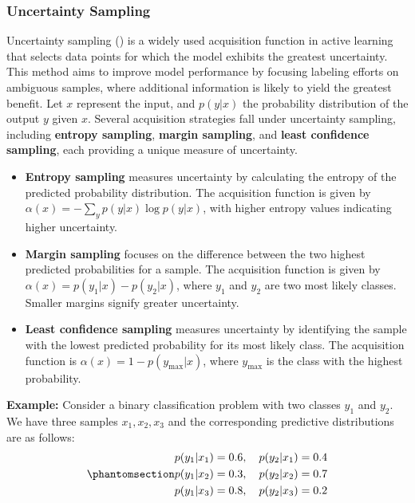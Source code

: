 \documentclass[
  letterpaper,
  numbers=noenddot,
  DIV=11]{scrreprt}
\theoremstyle{definition}
\theoremstyle{plain}
\theoremstyle{plain}
\theoremstyle{remark}
\begin{document}
\subsubsection*{Uncertainty Sampling}\label{uncertainty-sampling}

Uncertainty sampling () is
a widely used acquisition function in active learning that selects data
points for which the model exhibits the greatest uncertainty. This
method aims to improve model performance by focusing labeling efforts on
ambiguous samples, where additional information is likely to yield the
greatest benefit. Let \(x\) represent the input, and \(p(y|x)\) the
probability distribution of the output \(y\) given \(x\). Several
acquisition strategies fall under uncertainty sampling, including
\textbf{entropy sampling}, \textbf{margin sampling}, and \textbf{least
confidence sampling}, each providing a unique measure of uncertainty.

\begin{itemize}
\item
  \textbf{Entropy sampling} measures uncertainty by calculating the
  entropy of the predicted probability distribution. The acquisition
  function is given by \(\alpha(x) = - \sum_{y} p(y|x) \log p(y|x)\),
  with higher entropy values indicating higher uncertainty.
\item
  \textbf{Margin sampling} focuses on the difference between the two
  highest predicted probabilities for a sample. The acquisition function
  is given by \(\alpha(x) = p(y_1|x) - p(y_2|x)\), where \(y_1\) and
  \(y_2\) are two most likely classes. Smaller margins signify greater
  uncertainty.
\item
  \textbf{Least confidence sampling} measures uncertainty by identifying
  the sample with the lowest predicted probability for its most likely
  class. The acquisition function is
  \(\alpha(x) = 1 - p(y_{\text{max}}|x)\), where \(y_{\text{max}}\) is
  the class with the highest probability.
\end{itemize}

\textbf{Example:} Consider a binary classification problem with two
classes \(y_1\) and \(y_2\). We have three samples \(x_1, x_2, x_3\) and
the corresponding predictive distributions are as follows:
\begin{equation}\phantomsection\label{eq-eq3.1}{\begin{aligned}
p(y_1|x_1) &= 0.6, \quad p(y_2|x_1) = 0.4\\
p(y_1|x_2) &= 0.3, \quad p(y_2|x_2) = 0.7\\
p(y_1|x_3) &= 0.8, \quad p(y_2|x_3) = 0.2
\end{aligned}}\end{equation}
\end{document}
